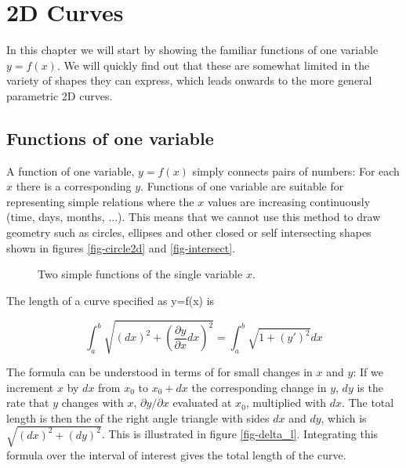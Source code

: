 
\chapter{2D Curves}
\label{sec:2dcurves}

In this chapter we will start by showing the familiar functions of one variable $y=f(x)$. We will quickly
find out that these are somewhat limited in the variety of shapes they can express, 
which leads onwards to the more general parametric 2D curves.

\section{Functions of one variable}
\label{sec:simplefuncs}

A function of one variable, $y=f(x)$ simply connects pairs of numbers: For each $x$ there is a corresponding $y$.
Functions of one variable are suitable for representing simple relations where the $x$ values
are increasing continuously (time, days, months, ...). This means that we cannot use this method to draw
geometry such as circles, ellipses and other closed or self intersecting shapes shown in 
figures \ref{fig-circle2d} and \ref{fig-intersect}.

\begin{figure}[h]
\caption{\small Two simple functions of the single variable $x$.}
\label{fig-simple2d}
\end{figure}

The length of a curve specified as y=f(x) is

$$
  \int_a^b\sqrt{(dx)^2 + (\frac{\partial y}{\partial x}dx)^2}=\int_a^b\sqrt{1+(y')^2}dx
$$

The formula can be understood in terms of  for small changes in $x$ and $y$:  If  
we increment $x$ by $dx$ from $x_0$ to $x_0 + dx$ the corresponding change in $y$, $dy$ is the rate
that $y$ changes with $x$, $\partial y/\partial x$ evaluated at $x_0$,
multiplied with $dx$. The total length is then the 
of the right angle triangle with sides $dx$ and $dy$, which is $\sqrt{(dx)^2 + (dy)^2}$. This is 
illustrated in figure \ref{fig-delta_l}.
Integrating this formula over the interval of interest gives the total length of the 
curve.


